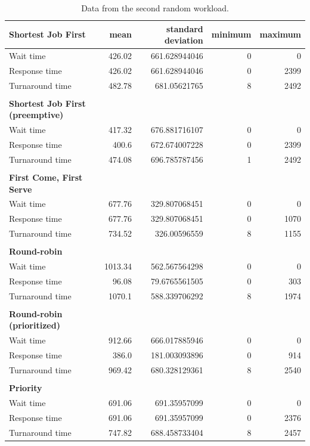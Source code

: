 \documentclass[12pt,letterpaper]{article}
\begin{document}
\begin{appendices}
			\begin{table}[H]
	 			\label{table:data-rand2}
	  			\caption{Data from the second random workload.}
		  		\begin{tabular}{l r r r r}
					\textbf{Shortest Job First} & mean & standard deviation & minimum & maximum\\
					\hline
Wait time &		426.02 &	661.628944046 &	0 &	0 	\\
Response time &		426.02 &	661.628944046 &	0 &	2399 	\\
Turnaround time &	482.78 &	681.05621765 &	8 &	2492 	\\
					\\
					\textbf{Shortest Job First (preemptive)} \\
					\hline
Wait time &		417.32 &	676.881716107 &	0 &	0 	\\
Response time &		400.6 &	672.674007228 &	0 &	2399 	\\
Turnaround time &	474.08 &	696.785787456 &	1 &	2492 	\\
					\\
					\textbf{First Come, First Serve} \\
					\hline
Wait time &		677.76 &	329.807068451 &	0 &	0 	\\
Response time &		677.76 &	329.807068451 &	0 &	1070 	\\
Turnaround time &	734.52 &	326.00596559 &	8 &	1155 	\\
					\\
					\textbf{Round-robin} \\
					\hline
Wait time &		1013.34 &	562.567564298 &	0 &	0 	\\
Response time &		96.08 &	79.6765561505 &	0 &	303 	\\
Turnaround time &	1070.1 &	588.339706292 &	8 &	1974 	\\
					\\
					\textbf{Round-robin (prioritized)} \\
					\hline
Wait time &		912.66 &	666.017885946 &	0 &	0 	\\
Response time &		386.0 &	181.003093896 &	0 &	914 	\\
Turnaround time &	969.42 &	680.328129361 &	8 &	2540 	\\
					\\
					\textbf{Priority} \\
					\hline
Wait time &		691.06 &	691.35957099 &	0 &	0 	\\
Response time &		691.06 &	691.35957099 &	0 &	2376 	\\
Turnaround time &	747.82 &	688.458733404 &	8 &	2457 	\\


\end{tabular}
\end{table}
\end{appendices}
\end{document}
